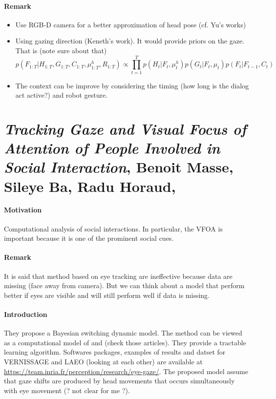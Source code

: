 \documentclass[11pt,a4paper]{article}
\begin{document}
\paragraph{Remark}
\begin{itemize}
\item Use RGB-D camera for a better approximation of head pose (cf. Yu's works)
\item Using gazing direction (Keneth's work). It would provide priors on the gaze. That is (note sure about that)
\begin{equation}
p(F_{1:T} | H_{1:T}, G_{1:T}, C_{1:T},\mu_{1:T}^h,R_{1:T}) \propto \prod_{t=1}^{T} p(H_t|F_t,\mu_t^h)p(G_t | F_t, \mu_t)p(F_t|F_{t-1},C_t)
\end{equation}
\item The context can be improve by considering the timing (how long is the dialog act active?) and robot gesture.
\end{itemize}

\section{\textit{Tracking Gaze and Visual Focus of Attention of People Involved in Social Interaction}, Benoit Masse, Sileye Ba, Radu Horaud, \cite{VFOAMasseBa2017}}

\paragraph{Motivation}
Computational analysis of social interactions. In particular, the VFOA is important because it is one of the prominent social cues.

\paragraph{Remark}
It is said that method based on eye tracking are ineffective because data are missing (face away from camera). But we can think about a model that perform better if eyes are visible and will still perform well if data is missing.

\paragraph{Introduction}
They propose a Bayesian switching dynamic model. The method can be viewed as a computational model of \cite{Freedman1997} and \cite{Freedman2008} (check those articles). They provide a tractable learning algorithm. Softwares packages, examples of results and datset for VERNISSAGE and LAEO (looking at each other) are available at \url{https://team.inria.fr/perception/research/eye-gaze/}. The proposed model assume that gaze shifts are produced by head movements that occurs simultaneously with eye movement (? not clear for me ?).
\end{document}
